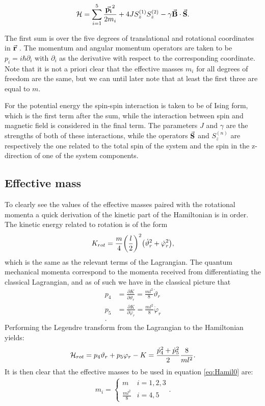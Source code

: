 \documentclass[a4paper]{article}
\begin{document}
\begin{equation}\label{eq:Hamil0}
        \mathbb{\cal H} = \sum_{i=1}^{5} \frac{\va{p_i}^2}{2m_i} + 4JS^{(1)}_{z}S^{(2)}_{z} -
        \gamma\va{B}\cdot \va{S}.
\end{equation}

The first sum is over the five degrees of translational and rotational coordinates in \(\va{r}\)
. The momentum and angular
momentum operators are
taken to be \(p_i = i\hbar \partial_i\label{def:mom}\) with \(\partial_i\) as the derivative with respect
to the
corresponding coordinate. Note that it is not a priori clear that the effective masses
\(m_i\) for
all degrees of freedom are the same, but we can until later note that at least the first
three are equal to \(m\).

For the potential energy the spin-spin interaction is taken to be of Ising form, which is
the first term after the sum, while the interaction between spin and magnetic field is
considered in the final term. %
The parameters \(J\) and \(\gamma\) are the strengths of both
of these interactions, while the operators \(\va{S}\) and \(S^{(n)}_{z}\) are respectively
the one
related to the total spin of the system and the spin in the z-direction of one of the
system
components.

\subsection{Effective mass}
To clearly see the values of the effective masses paired with the rotational momenta a quick derivation
of the kinetic part of the Hamiltonian is in order. The kinetic energy related to rotation
is of the form \[
K_{rot}= \frac{m}{4}\pqty{\frac{l}{2}}^2\pqty{\dot \vartheta_r^2 + \dot \varphi_r^2}
,\] 
which is the same as the relevant terms of the Lagrangian. The quantum mechanical momenta
correspond to the momenta received from differentiating the classical Lagrangian, and as
of %
such we have in the classical picture that 
\begin{align*}
        p_4 &= \frac{\partial K}{\partial \dot \vartheta_r} = \frac{ml^2}{8}\dot \vartheta_r\\
        p_5 &= \frac{\partial K}{\partial \dot \varphi_r} = \frac{ml^2}{8}\dot \varphi_r\\
.\end{align*}
Performing the Legendre transform from the Lagrangian to the Hamiltonian yields:
\begin{align*}
        \mathbb{\cal H}_{rot}= p_4 \vartheta_r + p_5 \varphi_r - K = \frac{\dot
        p_4^2 + \dot p_5^2}{2} \frac{8}{ml^2}
.\end{align*}
It is then clear that the effective masses to be used in equation \ref{eq:Hamil0} are:
\begin{align*}
        m_i = \begin{cases}
                m & i = 1, 2, 3\\
                \frac{ml^2}{8} & i = 4, 5
        \end{cases}
.\end{align*}
\end{document}
